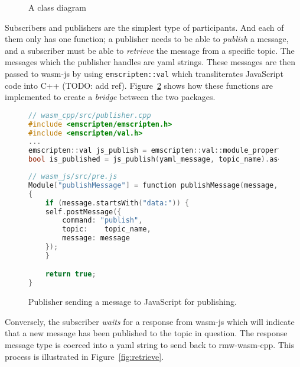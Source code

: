 \begin{figure}[htbp]
            \vspace{1em}
            \caption{A class diagram}
            \label{fig:classes}
        \end{figure}
        

        Subscribers and publishers are the simplest type of participants. And each of them only has one function; a publisher needs to be able to \textit{publish} a message, and a subscriber must be able to \textit{retrieve} the message from a specific topic. The messages which the publisher handles are yaml strings. These messages are then passed to \textsf{wasm-js} by using \texttt{emscripten::val} which transliterates JavaScript code into C++ (TODO: add ref). Figure~\ref{fig:publish} shows how these functions are implemented to create a \textit{bridge} between the two packages.

        \begin{figure}[htbp]
            \centering
            \begin{lstlisting}[language=C++]
// wasm_cpp/src/publisher.cpp
#include <emscripten/emscripten.h>
#include <emscripten/val.h>
...
emscripten::val js_publish = emscripten::val::module_property("publishMessage");
bool is_published = js_publish(yaml_message, topic_name).as<bool>();
\end{lstlisting}

            \begin{lstlisting}[language=C++] 
// wasm_js/src/pre.js
Module["publishMessage"] = function publishMessage(message, topic_name)
{
    if (message.startsWith("data:")) {
    self.postMessage({
        command: "publish",
        topic:    topic_name,
        message: message
    });
    }

    return true;
}
\end{lstlisting}
            \caption{Publisher sending a message to JavaScript for publishing.}
            \label{fig:publish}
        \end{figure}

    Conversely, the subscriber \textit{waits} for a response from \textsf{wasm-js} which will indicate that a new message has been published to the topic in question. The response message type is coerced into a yaml string to send back to \textsf{rmw-wasm-cpp}. This process is illustrated in Figure~\ref{fig:retrieve}.

